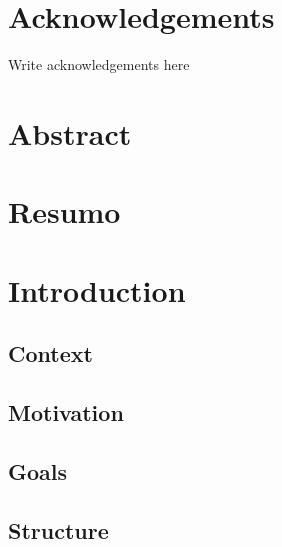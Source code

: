 \documentclass[
  oneside,
  11pt, a4paper,
  footinclude=true,
  headinclude=true,
  cleardoublepage=empty
]{scrbook}
\author{Aluno 1}
\date{\myear} %
\begin{document}
	\umfrontcover	
	\umtitlepage
	
	\chapter*{Acknowledgements}
	Write acknowledgements here



	\chapter*{Abstract}
	
	
	\cleardoublepage
	\chapter*{Resumo}
	
	
	
	\tableofcontents
	\listoffigures
	\listoftables
	\printglossary[type=\acronymtype]
	\clearpage
	\thispagestyle{empty}

	
	
	\chapter{Introduction}
	    
        \section{Context}
        
        \section{Motivation}
        
        \section{Goals}
        
        \section{Structure}
        
		
\end{document}
